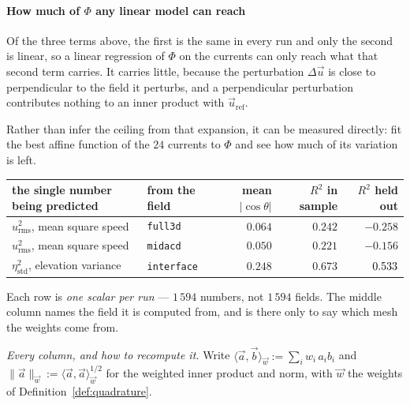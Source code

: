 \documentclass[11pt,a4paper]{article}
\theoremstyle{plain}
\theoremstyle{definition}
\theoremstyle{remark}
\begin{document}
\label{meas:cos}
\paragraph{How much of $\Phi$ any linear model can reach}
Of the three terms above, the first is the same in every run and only the second
is linear, so a linear regression of $\Phi$ on the currents can only reach what
that second term carries. It carries little, because the perturbation
$\Delta\vec{u}$ is close to perpendicular to the field it perturbs, and a
perpendicular perturbation contributes nothing to an inner product with
$\vec{u}_{\mathrm{ref}}$.

Rather than infer the ceiling from that expansion, it can be measured directly:
fit the best affine function of the $24$ currents to $\Phi$ and see how much of
its variation is left.
\begin{center}
\small
\begin{tabular}{@{}llrrr@{}}
\toprule
the single number being predicted & from the field & mean $|\cos\theta|$
  & $R^2$ in sample & $R^2$ held out \\
\midrule
$u_{\mathrm{rms}}^2$, mean square speed  & \texttt{full3d}    & $0.064$ & $0.242$ & $-0.258$ \\
$u_{\mathrm{rms}}^2$, mean square speed  & \texttt{midacd}    & $0.050$ & $0.221$ & $-0.156$ \\
$\eta_{\mathrm{std}}^2$, elevation variance & \texttt{interface} & $0.248$ & $0.673$ & $\hphantom{-}0.533$ \\
\bottomrule
\end{tabular}
\end{center}
\noindent
Each row is \emph{one scalar per run} --- $1\,594$ numbers, not $1\,594$ fields.
The middle column names the field it is computed from, and is there only to say
which mesh the weights come from.

\emph{Every column, and how to recompute it.} Write
$\langle \vec{a},\vec{b}\rangle_{\vec w} := \sum_i w_i\,a_i b_i$ and
$\|\vec{a}\|_{\vec w} := \langle\vec{a},\vec{a}\rangle_{\vec w}^{1/2}$ for the
weighted inner product and norm, with $\vec{w}$ the weights of
Definition~\ref{def:quadrature}.
\end{document}
